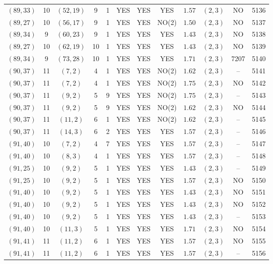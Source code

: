 \begin{longtable}{|c|c|c|c|c|c|c|c|c|c|c|c|}
$(89,33)$ & 10 & $(52,19)$ & 9 & 1 & YES & YES & YES & $1.57$ & $(2,3)$ & NO & 5136\\
$(89,27)$ & 10 & $(56,17)$ & 9 & 1 & YES & YES & NO(2) & $1.50$ & $(2,3)$ & NO & 5137\\
$(89,34)$ & 9 & $(60,23)$ & 9 & 1 & YES & YES & YES & $1.43$ & $(2,3)$ & NO & 5138\\
$(89,27)$ & 10 & $(62,19)$ & 10 & 1 & YES & YES & YES & $1.43$ & $(2,3)$ & NO & 5139\\
$(89,34)$ & 9 & $(73,28)$ & 10 & 1 & YES & YES & YES & $1.71$ & $(2,3)$ & 7207 & 5140\\
$(90,37)$ & 11 & $(7,2)$ & 4 & 1 & YES & YES & NO(2) & $1.62$ & $(2,3)$ & -- & 5141\\
$(90,37)$ & 11 & $(7,2)$ & 4 & 1 & YES & YES & NO(2) & $1.75$ & $(2,3)$ & NO & 5142\\
$(90,37)$ & 11 & $(9,2)$ & 5 & 9 & YES & YES & NO(2) & $1.75$ & $(2,3)$ & -- & 5143\\
$(90,37)$ & 11 & $(9,2)$ & 5 & 9 & YES & YES & NO(2) & $1.62$ & $(2,3)$ & NO & 5144\\
$(90,37)$ & 11 & $(11,2)$ & 6 & 1 & YES & YES & NO(2) & $1.62$ & $(2,3)$ & -- & 5145\\
$(90,37)$ & 11 & $(14,3)$ & 6 & 2 & YES & YES & YES & $1.57$ & $(2,3)$ & -- & 5146\\
$(91,40)$ & 10 & $(7,2)$ & 4 & 7 & YES & YES & YES & $1.57$ & $(2,3)$ & -- & 5147\\
$(91,40)$ & 10 & $(8,3)$ & 4 & 1 & YES & YES & YES & $1.57$ & $(2,3)$ & -- & 5148\\
$(91,25)$ & 10 & $(9,2)$ & 5 & 1 & YES & YES & YES & $1.43$ & $(2,3)$ & -- & 5149\\
$(91,25)$ & 10 & $(9,2)$ & 5 & 1 & YES & YES & YES & $1.57$ & $(2,3)$ & NO & 5150\\
$(91,40)$ & 10 & $(9,2)$ & 5 & 1 & YES & YES & YES & $1.43$ & $(2,3)$ & NO & 5151\\
$(91,40)$ & 10 & $(9,2)$ & 5 & 1 & YES & YES & YES & $1.43$ & $(2,3)$ & NO & 5152\\
$(91,40)$ & 10 & $(9,2)$ & 5 & 1 & YES & YES & YES & $1.43$ & $(2,3)$ & -- & 5153\\
$(91,40)$ & 10 & $(11,3)$ & 5 & 1 & YES & YES & YES & $1.71$ & $(2,3)$ & NO & 5154\\
$(91,41)$ & 11 & $(11,2)$ & 6 & 1 & YES & YES & YES & $1.57$ & $(2,3)$ & NO & 5155\\
$(91,41)$ & 11 & $(11,2)$ & 6 & 1 & YES & YES & YES & $1.57$ & $(2,3)$ & -- & 5156\\

\end{longtable}
